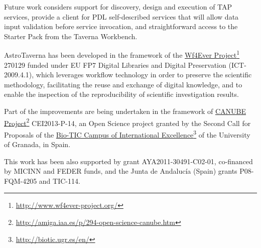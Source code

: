 \documentclass{aa}
\newcommand{\urlsamefont}[1]{\urlstyle{same}\url{#1}}
\newcommand{\hrefnote}[2]{\href{#1}{#2}\footnote{\urlsamefont{#1}}}
\begin{document}
Future work considers support for discovery, design and execution of TAP services, provide a client for PDL self-described services that will allow data input validation before service invocation, and straightforward access to the Starter Pack from the Taverna Workbench.

\begin{acknowledgements}

AstroTaverna has been developed in the framework of the \hrefnote{http://www.wf4ever-project.org/}{Wf4Ever Project} 270129 funded under EU FP7 Digital Libraries and Digital Preservation (ICT-2009.4.1), which leverages workflow technology in order to preserve the scientific methodology, facilitating the reuse and exchange of digital knowledge, and to enable the inspection of the reproducibility of scientific investigation results.

Part of the improvements are being undertaken in the framework of \hrefnote{http://amiga.iaa.es/p/294-open-science-canube.htm}{CANUBE Project} CEI2013-P-14, an Open Science project granted by the Second Call for Proposals of the \hrefnote{http://biotic.ugr.es/en/}{Bio-TIC Campus of International Excellence} of the University of Granada, in Spain.

This work has been also supported by grant AYA2011-30491-C02-01, co-financed by MICINN and FEDER funds, and the Junta de Andalucía (Spain) grants P08-FQM-4205 and TIC-114.

\end{acknowledgements}


\end{document}
